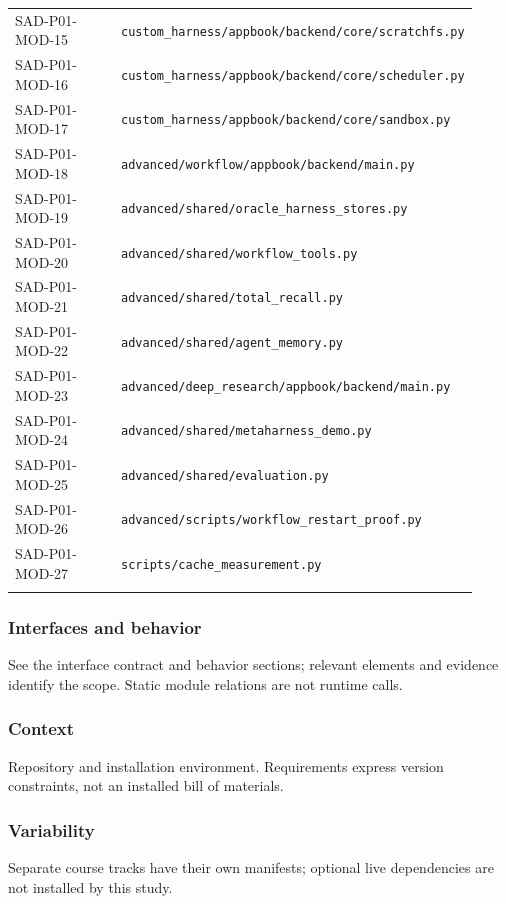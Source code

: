 \documentclass[10pt,letterpaper]{article}
\begin{document}
\begin{longtable}{@{}>{\raggedright\arraybackslash}p{0.24\linewidth}>{\raggedright\arraybackslash}p{0.68\linewidth}@{}}
SAD-P01-MOD-15 & \nolinkurl{custom_harness/appbook/backend/core/scratchfs.py}\\\addlinespace
SAD-P01-MOD-16 & \nolinkurl{custom_harness/appbook/backend/core/scheduler.py}\\\addlinespace
SAD-P01-MOD-17 & \nolinkurl{custom_harness/appbook/backend/core/sandbox.py}\\\addlinespace
SAD-P01-MOD-18 & \nolinkurl{advanced/workflow/appbook/backend/main.py}\\\addlinespace
SAD-P01-MOD-19 & \nolinkurl{advanced/shared/oracle_harness_stores.py}\\\addlinespace
SAD-P01-MOD-20 & \nolinkurl{advanced/shared/workflow_tools.py}\\\addlinespace
SAD-P01-MOD-21 & \nolinkurl{advanced/shared/total_recall.py}\\\addlinespace
SAD-P01-MOD-22 & \nolinkurl{advanced/shared/agent_memory.py}\\\addlinespace
SAD-P01-MOD-23 & \nolinkurl{advanced/deep_research/appbook/backend/main.py}\\\addlinespace
SAD-P01-MOD-24 & \nolinkurl{advanced/shared/metaharness_demo.py}\\\addlinespace
SAD-P01-MOD-25 & \nolinkurl{advanced/shared/evaluation.py}\\\addlinespace
SAD-P01-MOD-26 & \nolinkurl{advanced/scripts/workflow_restart_proof.py}\\\addlinespace
SAD-P01-MOD-27 & \nolinkurl{scripts/cache_measurement.py}\\\addlinespace
\bottomrule\end{longtable}

\subsubsection{Interfaces and behavior}
See the interface contract and behavior sections; relevant elements and evidence identify the scope. Static module relations are not runtime calls.
\subsubsection{Context}
Repository and installation environment. Requirements express version constraints, not an installed bill of materials.
\subsubsection{Variability}
Separate course tracks have their own manifests; optional live dependencies are not installed by this study.
\end{document}
